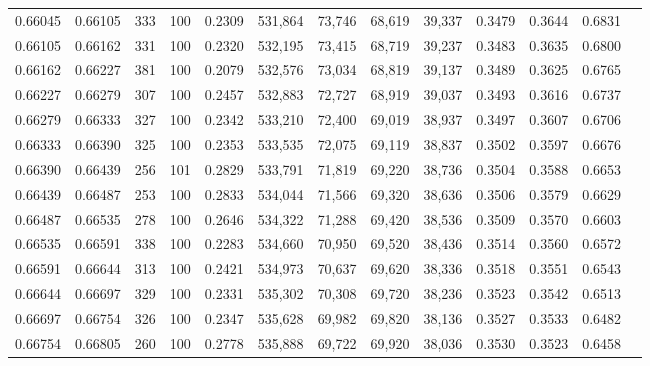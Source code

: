 \begin{tabular}{rrrrrrrrrrrrr}
0.66045 & 0.66105 &   333 & 100 &                                     0.2309 & 531,864 &  73,746 &  68,619 &  39,337 & 0.3479 & 0.3644 & 0.6831 \\
0.66105 & 0.66162 &   331 & 100 &                                     0.2320 & 532,195 &  73,415 &  68,719 &  39,237 & 0.3483 & 0.3635 & 0.6800 \\
0.66162 & 0.66227 &   381 & 100 &                                     0.2079 & 532,576 &  73,034 &  68,819 &  39,137 & 0.3489 & 0.3625 & 0.6765 \\
0.66227 & 0.66279 &   307 & 100 &                                     0.2457 & 532,883 &  72,727 &  68,919 &  39,037 & 0.3493 & 0.3616 & 0.6737 \\
0.66279 & 0.66333 &   327 & 100 &                                     0.2342 & 533,210 &  72,400 &  69,019 &  38,937 & 0.3497 & 0.3607 & 0.6706 \\
0.66333 & 0.66390 &   325 & 100 &                                     0.2353 & 533,535 &  72,075 &  69,119 &  38,837 & 0.3502 & 0.3597 & 0.6676 \\
0.66390 & 0.66439 &   256 & 101 &                                     0.2829 & 533,791 &  71,819 &  69,220 &  38,736 & 0.3504 & 0.3588 & 0.6653 \\
0.66439 & 0.66487 &   253 & 100 &                                     0.2833 & 534,044 &  71,566 &  69,320 &  38,636 & 0.3506 & 0.3579 & 0.6629 \\
0.66487 & 0.66535 &   278 & 100 &                                     0.2646 & 534,322 &  71,288 &  69,420 &  38,536 & 0.3509 & 0.3570 & 0.6603 \\
0.66535 & 0.66591 &   338 & 100 &                                     0.2283 & 534,660 &  70,950 &  69,520 &  38,436 & 0.3514 & 0.3560 & 0.6572 \\
0.66591 & 0.66644 &   313 & 100 &                                     0.2421 & 534,973 &  70,637 &  69,620 &  38,336 & 0.3518 & 0.3551 & 0.6543 \\
0.66644 & 0.66697 &   329 & 100 &                                     0.2331 & 535,302 &  70,308 &  69,720 &  38,236 & 0.3523 & 0.3542 & 0.6513 \\
0.66697 & 0.66754 &   326 & 100 &                                     0.2347 & 535,628 &  69,982 &  69,820 &  38,136 & 0.3527 & 0.3533 & 0.6482 \\
0.66754 & 0.66805 &   260 & 100 &                                     0.2778 & 535,888 &  69,722 &  69,920 &  38,036 & 0.3530 & 0.3523 & 0.6458 \\

\end{tabular}
